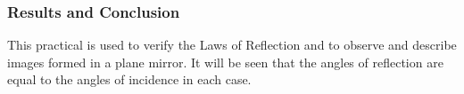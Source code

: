 \subsubsection*{Results and Conclusion}
This practical is used to verify the Laws of Reflection and to observe and describe images formed in a plane mirror.  It will be seen that the angles of reflection are equal to the angles of incidence in each case.
